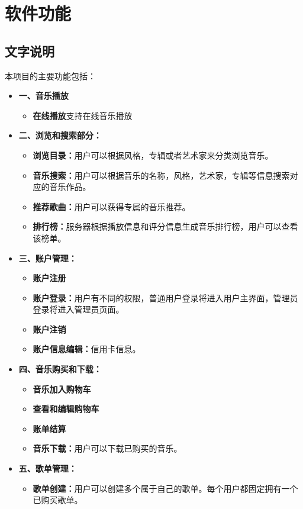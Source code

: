 \section{软件功能}
\subsection{文字说明}
本项目的主要功能包括：
\begin{itemize}
\item \textbf{一、音乐播放}
\begin{itemize}
	\item \textbf{在线播放}支持在线音乐播放
\end{itemize}
\item  \textbf{二、浏览和搜索部分：}
\begin{itemize}
	\item \textbf{浏览目录：}用户可以根据风格，专辑或者艺术家来分类浏览音乐。
	\item \textbf{音乐搜索：}用户可以根据音乐的名称，风格，艺术家，专辑等信息搜索对应的音乐作品。
	\item \textbf{推荐歌曲：}用户可以获得专属的音乐推荐。
	\item \textbf{排行榜：}服务器根据播放信息和评分信息生成音乐排行榜，用户可以查看该榜单。
\end{itemize}
\item \textbf{三、账户管理：}
\begin{itemize}
	\item \textbf{账户注册}
	\item \textbf{账户登录：}用户有不同的权限，普通用户登录将进入用户主界面，管理员登录将进入管理员页面。
	\item \textbf{账户注销}
	\item \textbf{账户信息编辑：}信用卡信息。
\end{itemize}
\item \textbf{四、音乐购买和下载：}
\begin{itemize}
	\item \textbf{音乐加入购物车}
	\item \textbf{查看和编辑购物车}
	\item \textbf{账单结算}
	\item \textbf{音乐下载：}用户可以下载已购买的音乐。
\end{itemize}
\item \textbf{五、歌单管理：}
\begin{itemize}
	\item \textbf{歌单创建：}用户可以创建多个属于自己的歌单。每个用户都固定拥有一个已购买歌单。

\end{itemize}
\end{itemize}
